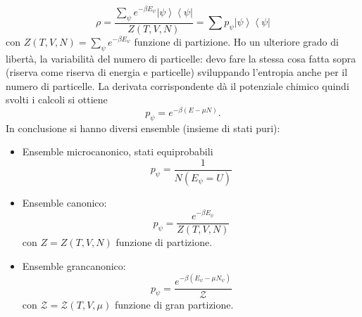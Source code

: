 \begin{equation}
\rho=\frac{\sum_{\psi }{e^{-\beta E_\psi }\left |\psi  \right\rangle\left\langle \psi \right |}}{Z\left(T,V,N\right)}=\sum{p_\psi \left |\psi  \right\rangle\left\langle \psi \right |}
\end{equation}
con $Z\left(T,V,N\right)=\sum_{\psi }{e^{-\beta E_\psi }}$ funzione di partizione.
Ho un ulteriore grado di libertà, la variabilità del numero di particelle: devo fare la stessa cosa fatta sopra (riserva come riserva di energia e particelle) sviluppando l'entropia anche per il numero di particelle. La derivata corrispondente dà il potenziale chimico quindi svolti i calcoli si ottiene
$$ p_{\psi}=e^{-\beta(E-\mu N)}.$$
In conclusione si hanno diversi ensemble (insieme di stati puri):
\begin{itemize}
\item Ensemble microcanonico, stati equiprobabili
\begin{equation*}
p_\psi =\frac{1}{N\left(E_\psi =U\right)}
\end{equation*}
\item Ensemble canonico:
\begin{equation*}
p_\psi =\frac{e^{-\beta E_\psi }}{Z\left(T,V,N\right)}
\end{equation*}
con $Z=Z\left(T,V,N\right)$ funzione di partizione.
\item Ensemble grancanonico:
\begin{equation*}
p_\psi =\frac{e^{-\beta \left(E_\psi -\mu N_\psi \right)}}{\mathcal{Z}}
\end{equation*}
con $\mathcal{Z}=\mathcal{Z}\left(T,V,\mu\right)$ funzione di gran partizione.
\end{itemize}

%